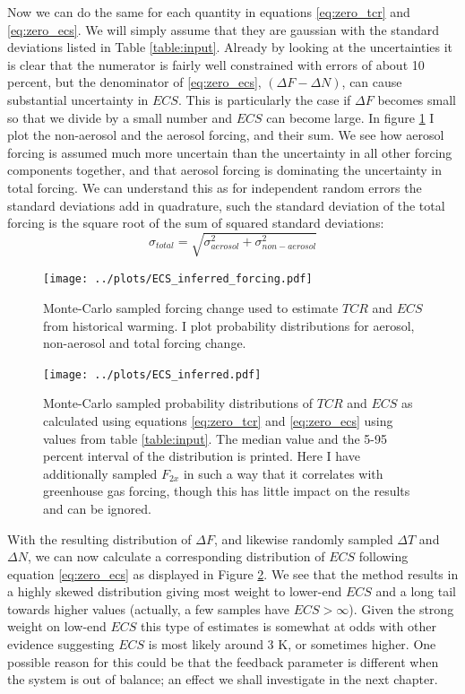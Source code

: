 \documentclass[12pt]{book}
\begin{document}
Now we can do the same for each quantity in equations \ref{eq:zero_tcr} and \ref{eq:zero_ecs}. We will simply assume that they are gaussian with the standard deviations listed in Table \ref{table:input}. Already by looking at the uncertainties it is clear that the numerator is fairly well constrained with errors of about 10 percent, but the denominator of \ref{eq:zero_ecs}, $(\Delta F - \Delta N)$, can cause substantial uncertainty in $ECS$. This is particularly the case if $\Delta F$ becomes small so that we divide by a small number and $ECS$ can become large. 
In figure \ref{fig:ECS_inferred_forcing} I plot the non-aerosol and the aerosol forcing, and their sum. We see how aerosol forcing is assumed much more uncertain than the uncertainty in all other forcing components together, and that aerosol forcing is dominating the uncertainty in total forcing. We can understand this as for independent random errors the standard deviations add in quadrature, such the standard deviation of the total forcing is the square root of the sum of squared standard deviations:
$$ \sigma_{total} = \sqrt{\sigma_{aerosol}^2 + \sigma_{non-aerosol}^2}$$

\begin{figure}
\begin{center}
\texttt{[image: ../plots/ECS\_inferred\_forcing.pdf]}
\end{center}
\caption{ Monte-Carlo sampled forcing change used to estimate $TCR$ and $ECS$ from historical warming. I plot probability distributions for aerosol, non-aerosol and total forcing change. } 
\label{fig:ECS_inferred_forcing}
\end{figure}

\begin{figure}
	\begin{center}
		\texttt{[image: ../plots/ECS\_inferred.pdf]}
	\end{center}
	\caption{ Monte-Carlo sampled probability distributions of $TCR$ and $ECS$ as calculated using equations \ref{eq:zero_tcr} and \ref{eq:zero_ecs} using values from table \ref{table:input}. The median value and the 5-95 percent interval of the distribution is printed. Here I have additionally sampled $F_{2x}$ in such a way that it correlates with greenhouse gas forcing, though this has little impact on the results and can be ignored. } 
	\label{fig:ECS_inferred}
\end{figure}

With the resulting distribution of $\Delta F$, and likewise randomly sampled $\Delta T$ and $\Delta N$, we can now calculate a corresponding distribution of $ECS$ following equation \ref{eq:zero_ecs} as displayed in Figure \ref{fig:ECS_inferred}. We see that the method results in a highly skewed distribution giving most weight to lower-end $ECS$ and a long tail towards higher values (actually, a few samples have $ECS > \infty$). Given the strong weight on low-end $ECS$ this type of estimates is somewhat at odds with other evidence suggesting $ECS$ is most likely around 3 K, or sometimes higher. One possible reason for this could be that the feedback parameter is different when the system is out of balance; an effect we shall investigate in the next chapter.
\end{document}
